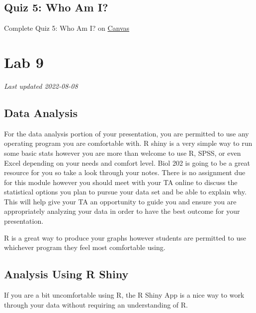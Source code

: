 \documentclass[
]{book}
\begin{document}
\hypertarget{quiz-5-who-am-i}{%
\chapter*{Quiz 5: Who Am I?}\label{quiz-5-who-am-i}}

Complete Quiz 5: Who Am I? on \href{https://canvas.ubc.ca/courses/113910}{Canvas}

\hypertarget{part-lab-9}{%
\part*{Lab 9}\label{part-lab-9}}

\emph{Last updated 2022-08-08}

\hypertarget{data-analysis}{%
\chapter*{Data Analysis}\label{data-analysis}}

For the data analysis portion of your presentation, you are permitted to use any operating program you are comfortable with. R shiny is a very simple way to run some basic stats however you are more than welcome to use R, SPSS, or even Excel depending on your needs and comfort level. Biol 202 is going to be a great resource for you so take a look through your notes. There is no assignment due for this module however you should meet with your TA online to discuss the statistical options you plan to pursue your data set and be able to explain why. This will help give your TA an opportunity to guide you and ensure you are appropriately analyzing your data in order to have the best outcome for your presentation.

R is a great way to produce your graphs however students are permitted to use whichever program they feel most comfortable using.

\hypertarget{analysis-using-r-shiny}{%
\chapter*{Analysis Using R Shiny}\label{analysis-using-r-shiny}}

If you are a bit uncomfortable using R, the R Shiny App is a nice way to work through your data without requiring an understanding of R.
\end{document}
